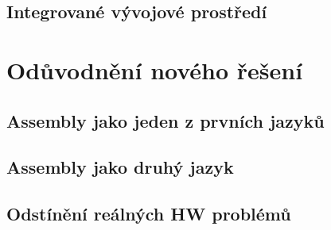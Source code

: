 \blind[5]

\subsection{Integrované vývojové prostředí}

\blind[2]

\section{Odůvodnění nového řešení}

\blind[1]

\subsection{Assembly jako jeden z prvních jazyků}

\blind[3]

\subsection{Assembly jako druhý jazyk}

\blind[3]

\subsection{Odstínění reálných HW problémů}

\blind[2]